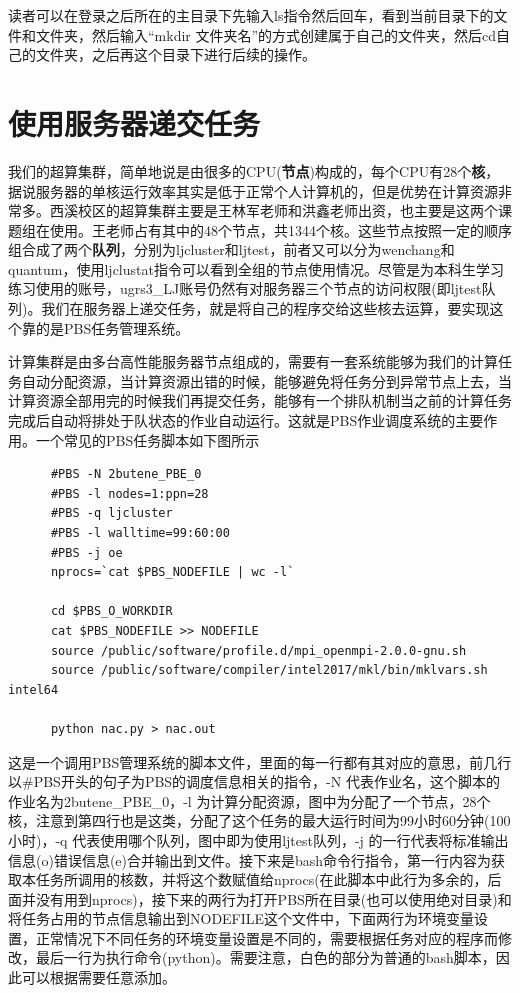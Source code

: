 \documentclass[12pt,a4paper,openany,twoside]{book}
\numberwithin{equation}{section}
\begin{document}
    读者可以在登录之后所在的主目录下先输入ls指令然后回车，看到当前目录下的文件和文件夹，然后输入“mkdir 文件夹名”的方式创建属于自己的文件夹，然后cd自己的文件夹，之后再这个目录下进行后续的操作。
    
    \section{使用服务器递交任务}
    我们的超算集群，简单地说是由很多的CPU(\textbf{节点})构成的，每个CPU有28个\textbf{核}，据说服务器的单核运行效率其实是低于正常个人计算机的，但是优势在计算资源非常多。西溪校区的超算集群主要是王林军老师和洪鑫老师出资，也主要是这两个课题组在使用。王老师占有其中的48个节点，共1344个核。这些节点按照一定的顺序组合成了两个\textbf{队列}，分别为ljcluster和ljtest，前者又可以分为wenchang和quantum，使用ljclustat指令可以看到全组的节点使用情况。尽管是为本科生学习练习使用的账号，ugrs3\_LJ账号仍然有对服务器三个节点的访问权限(即ljtest队列)。我们在服务器上递交任务，就是将自己的程序交给这些核去运算，要实现这个靠的是PBS任务管理系统。
    
    计算集群是由多台高性能服务器节点组成的，需要有一套系统能够为我们的计算任务自动分配资源，当计算资源出错的时候，能够避免将任务分到异常节点上去，当计算资源全部用完的时候我们再提交任务，能够有一个排队机制当之前的计算任务完成后自动将排处于队状态的作业自动运行。这就是PBS作业调度系统的主要作用。一个常见的PBS任务脚本如下图所示
    \begin{lstlisting}
      #PBS -N 2butene_PBE_0
      #PBS -l nodes=1:ppn=28
      #PBS -q ljcluster
      #PBS -l walltime=99:60:00
      #PBS -j oe
      nprocs=`cat $PBS_NODEFILE | wc -l`
      
      cd $PBS_O_WORKDIR
      cat $PBS_NODEFILE >> NODEFILE
      source /public/software/profile.d/mpi_openmpi-2.0.0-gnu.sh
      source /public/software/compiler/intel2017/mkl/bin/mklvars.sh intel64
      
      python nac.py > nac.out
    \end{lstlisting}

    这是一个调用PBS管理系统的脚本文件，里面的每一行都有其对应的意思，前几行以\#PBS开头的句子为PBS的调度信息相关的指令，-N 代表作业名，这个脚本的作业名为2butene\_PBE\_0，-l 为计算分配资源，图中为分配了一个节点，28个核，注意到第四行也是这类，分配了这个任务的最大运行时间为99小时60分钟(100小时)，-q 代表使用哪个队列，图中即为使用ljtest队列，-j 的一行代表将标准输出信息(o)错误信息(e)合并输出到文件。接下来是bash命令行指令，第一行内容为获取本任务所调用的核数，并将这个数赋值给nprocs(在此脚本中此行为多余的，后面并没有用到nprocs)，接下来的两行为打开PBS所在目录(也可以使用绝对目录)和将任务占用的节点信息输出到NODEFILE这个文件中，下面两行为环境变量设置，正常情况下不同任务的环境变量设置是不同的，需要根据任务对应的程序而修改，最后一行为执行命令(python)。需要注意，白色的部分为普通的bash脚本，因此可以根据需要任意添加。
\end{document}

